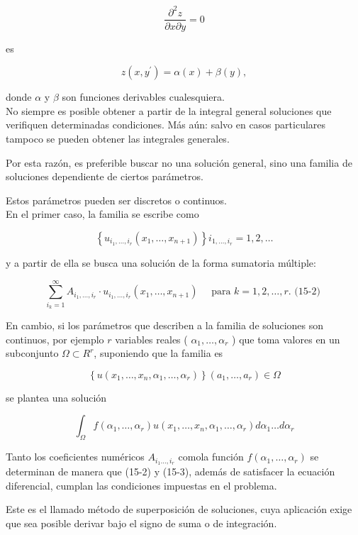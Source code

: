 \documentclass[10pt]{article}
\theoremstyle{plain}
\theoremstyle{definition}
\theoremstyle{remark}
\begin{document}
$$
\frac{\partial^{2} z}{\partial x \partial y}=0
$$

es

$$
z\left(x, y^{\prime}\right)=\alpha(x)+\beta(y),
$$

donde $\alpha$ y $\beta$ son funciones derivables cualesquiera.\\
No siempre es posible obtener a partir de la integral general soluciones que verifiquen determinadas condiciones. Más aún: salvo en casos particulares tampoco se pueden obtener las integrales generales.

Por esta razón, es preferible buscar no una solución general, sino una familia de soluciones dependiente de ciertos parámetros.

Estos parámetros pueden ser discretos o continuos.\\
En el primer caso, la familia se escribe como

$$
\left\{u_{i_{1}, \ldots, i_{r}}\left(x_{1}, \ldots, x_{n+1}\right)\right\} i_{1, \ldots, i_{r}}=1,2, \ldots
$$

y a partir de ella se busca una solución de la forma sumatoria múltiple:

$$
\sum_{i_{k}=1}^{\infty} A_{i_{1}, \ldots, i_{r}} \cdot u_{i_{1}, \ldots, i_{r}}\left(x_{1}, \ldots, x_{n+1}\right) \quad \text { para } k=1,2, \ldots, r . \text { (15-2) }
$$

En cambio, si los parámetros que describen a la familia de soluciones son continuos, por ejemplo $r$ variables reales ( $\alpha_{1}, \ldots, \alpha_{r}$ ) que toma valores en un subconjunto $\Omega \subset R^{r}$, suponiendo que la familia es

$$
\left\{u\left(x_{1}, \ldots, x_{n}, \alpha_{1}, \ldots, \alpha_{r}\right)\right\}\left(a_{1}, \ldots, a_{r}\right) \in \Omega
$$

se plantea una solución


\begin{equation*}
\int_{\Omega} f\left(\alpha_{1}, \ldots, \alpha_{r}\right) u\left(x_{1}, \ldots, x_{n}, \alpha_{1}, \ldots, \alpha_{r}\right) d \alpha_{1} \ldots d \alpha_{r} \tag{15-3}
\end{equation*}


Tanto los coeficientes numéricos $A_{i_{1} \ldots, i_{r}}$ comola función $f\left(\alpha_{1}, \ldots, \alpha_{r}\right)$ se determinan de manera que (15-2) y (15-3), además de satisfacer la ecuación diferencial, cumplan las condiciones impuestas en el problema.

Este es el llamado método de superposición de soluciones, cuya aplicación exige que sea posible derivar bajo el signo de suma o de integración.
\end{document}
